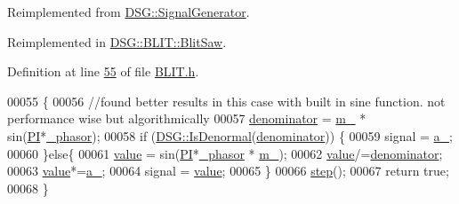 Reimplemented from \hyperlink{class_d_s_g_1_1_signal_generator_a46fe75a81a242e191c5049d33ddf4155}{D\+S\+G\+::\+Signal\+Generator}.



Reimplemented in \hyperlink{class_d_s_g_1_1_b_l_i_t_1_1_blit_saw_ae24821c51b23b9fe9220a620e558af04}{D\+S\+G\+::\+B\+L\+I\+T\+::\+Blit\+Saw}.



Definition at line \hyperlink{_b_l_i_t_8h_source_l00055}{55} of file \hyperlink{_b_l_i_t_8h_source}{B\+L\+I\+T.\+h}.


\begin{DoxyCode}
00055                                                             \{
00056             \textcolor{comment}{//found better results in this case with built in sine function. not performance wise but
       algorithmically}
00057             \hyperlink{class_d_s_g_1_1_b_l_i_t_1_1_blit_a6de89a5a240f226c940aef97661c9cee}{denominator} = \hyperlink{class_d_s_g_1_1_b_l_i_t_1_1_blit_afa6e4d46efdbfa032762610601ed42a0}{m\_} * sin(\hyperlink{_p_i_8h_a598a3330b3c21701223ee0ca14316eca}{PI}*\hyperlink{class_d_s_g_1_1_signal_generator_a1e23eb94e204b11db75fca030b951065}{\_phasor});
00058             \textcolor{keywordflow}{if} (\hyperlink{namespace_d_s_g_a9eee3c39a1f45d42f0b4fa7201d3ba3d}{DSG::IsDenormal}(\hyperlink{class_d_s_g_1_1_b_l_i_t_1_1_blit_a6de89a5a240f226c940aef97661c9cee}{denominator})) \{
00059                 signal = \hyperlink{class_d_s_g_1_1_b_l_i_t_1_1_blit_a66e2a97840ad0772daaaa9aea63b77b4}{a\_};
00060             \}\textcolor{keywordflow}{else}\{
00061                 \hyperlink{class_d_s_g_1_1_b_l_i_t_1_1_blit_ac8fb9d4fb45d0697bf364bb5d6b570ce}{value} = sin(\hyperlink{_p_i_8h_a598a3330b3c21701223ee0ca14316eca}{PI}*\hyperlink{class_d_s_g_1_1_signal_generator_a1e23eb94e204b11db75fca030b951065}{\_phasor} * \hyperlink{class_d_s_g_1_1_b_l_i_t_1_1_blit_afa6e4d46efdbfa032762610601ed42a0}{m\_});
00062                 \hyperlink{class_d_s_g_1_1_b_l_i_t_1_1_blit_ac8fb9d4fb45d0697bf364bb5d6b570ce}{value}/=\hyperlink{class_d_s_g_1_1_b_l_i_t_1_1_blit_a6de89a5a240f226c940aef97661c9cee}{denominator};
00063                 \hyperlink{class_d_s_g_1_1_b_l_i_t_1_1_blit_ac8fb9d4fb45d0697bf364bb5d6b570ce}{value}*=\hyperlink{class_d_s_g_1_1_b_l_i_t_1_1_blit_a66e2a97840ad0772daaaa9aea63b77b4}{a\_};
00064                 signal = \hyperlink{class_d_s_g_1_1_b_l_i_t_1_1_blit_ac8fb9d4fb45d0697bf364bb5d6b570ce}{value};
00065             \}
00066             \hyperlink{class_d_s_g_1_1_signal_generator_a4c034c5b9ef3dc7548839288355643d5}{step}();
00067             \textcolor{keywordflow}{return} \textcolor{keyword}{true};
00068         \}
\end{DoxyCode}

